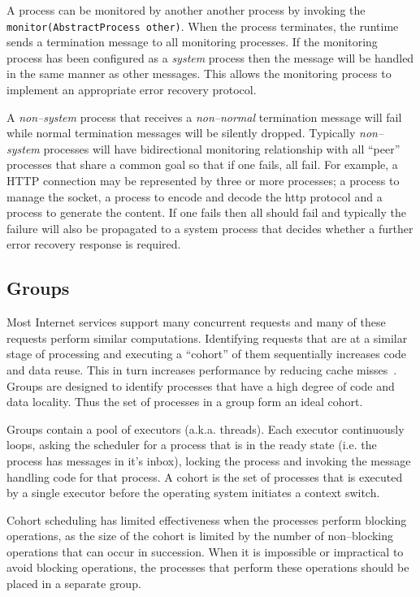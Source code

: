 \documentclass[conference]{IEEEtran}
\begin{document}
A process can be monitored by another another process by invoking the \verb+monitor(AbstractProcess other)+. When the process terminates, the runtime sends a termination message to all monitoring processes. If the monitoring process has been configured as a \emph{system} process then the message will be handled in the same manner as other messages. This allows the monitoring process to implement an appropriate error recovery protocol.

A \emph{non--system} process that receives a \emph{non--normal} termination message will fail while normal termination messages will be silently dropped. Typically \emph{non--system} processes will have bidirectional monitoring relationship with all ``peer'' processes that share a common goal so that if one fails, all fail. For example, a HTTP connection may be represented by three or more processes; a process to manage the socket, a process to encode and decode the http protocol and a process to generate the content. If one fails then all should fail and typically the failure will also be propagated to a system process that decides whether a further error recovery response is required.

\subsection{Groups}
\label{section:Groups}

Most Internet services support many concurrent requests and many of these requests perform similar computations. Identifying requests that are at a similar stage of processing and executing a ``cohort'' of them sequentially increases code and data reuse. This in turn increases performance by reducing cache misses~\cite{Larus:2002:Cohort,welsh03Adaptive}. Groups are designed to identify processes that have a high degree of code and data locality. Thus the set of processes in a group form an ideal cohort.

Groups contain a pool of executors (a.k.a. threads). Each executor continuously loops, asking the scheduler for a process that is in the ready state (i.e. the process has messages in it's inbox), locking the process and invoking the message handling code for that process. A cohort is the set of processes that is executed by a single executor before the operating system initiates a context switch.

Cohort scheduling has limited effectiveness when the processes perform blocking operations, as the size of the cohort is limited by the number of non--blocking operations that can occur in succession. When it is impossible or impractical to avoid blocking operations, the processes that perform these operations should be placed in a separate group.
\end{document}
